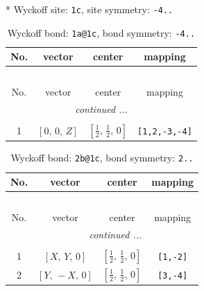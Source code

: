 \documentclass[fleqn,8pt]{jsarticle}
\begin{document}
* Wyckoff site: {\tt 1c}, site symmetry: {\tt -4..}
\renewcommand{\arraystretch}{1.2}
\begin{longtable}{cccc}
\caption{Wyckoff bond: {\tt 1a@1c}, bond symmetry: {\tt -4..}}
 \\
 \hline \hline
No. & vector & center & mapping \\ \hline \endfirsthead

\multicolumn{3}{l}{\tablename\ \thetable{}} \\
 \hline \hline
No. & vector & center & mapping \\ \hline \endhead

 \hline \hline
\multicolumn{3}{r}{\footnotesize\it continued ...} \\ \endfoot

 \hline \hline
\multicolumn{3}{r}{} \\ \endlastfoot

1 & $\left[ 0,\, 0,\, Z \right]$ & $\left[ \frac{1}{2},\, \frac{1}{2},\, 0 \right]$ & {\tt [1,2,-3,-4]} \\
\end{longtable}
\renewcommand{\arraystretch}{1.2}
\begin{longtable}{cccc}
\caption{Wyckoff bond: {\tt 2b@1c}, bond symmetry: {\tt 2..}}
 \\
 \hline \hline
No. & vector & center & mapping \\ \hline \endfirsthead

\multicolumn{3}{l}{\tablename\ \thetable{}} \\
 \hline \hline
No. & vector & center & mapping \\ \hline \endhead

 \hline \hline
\multicolumn{3}{r}{\footnotesize\it continued ...} \\ \endfoot

 \hline \hline
\multicolumn{3}{r}{} \\ \endlastfoot

1 & $\left[ X,\, Y,\, 0 \right]$ & $\left[ \frac{1}{2},\, \frac{1}{2},\, 0 \right]$ & {\tt [1,-2]} \\ \hline
2 & $\left[ Y,\, - X,\, 0 \right]$ & $\left[ \frac{1}{2},\, \frac{1}{2},\, 0 \right]$ & {\tt [3,-4]} \\
\end{longtable}
\renewcommand{\arraystretch}{1.2}
\end{document}
